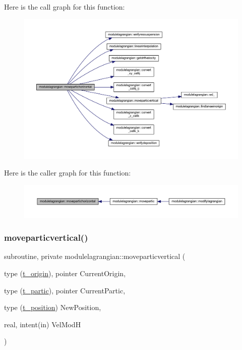 Here is the call graph for this function\+:\nopagebreak
\begin{figure}[H]
\begin{center}
\leavevmode
\includegraphics[width=350pt]{namespacemodulelagrangian_a9117067712a5138b783af1e0e971235f_cgraph}
\end{center}
\end{figure}
Here is the caller graph for this function\+:\nopagebreak
\begin{figure}[H]
\begin{center}
\leavevmode
\includegraphics[width=350pt]{namespacemodulelagrangian_a9117067712a5138b783af1e0e971235f_icgraph}
\end{center}
\end{figure}
\mbox{\label{namespacemodulelagrangian_aee1cf00f54feae6409c4674532876dcc}} 
\subsubsection{\texorpdfstring{moveparticvertical()}{moveparticvertical()}}
{\footnotesize\ttfamily subroutine, private modulelagrangian\+::moveparticvertical (\begin{DoxyParamCaption}\item[{type (\mbox{\hyperlink{structmodulelagrangian_1_1t__origin}{t\+\_\+origin}}), pointer}]{Current\+Origin,  }\item[{type (\mbox{\hyperlink{structmodulelagrangian_1_1t__partic}{t\+\_\+partic}}), pointer}]{Current\+Partic,  }\item[{type (\mbox{\hyperlink{structmodulelagrangian_1_1t__position}{t\+\_\+position}})}]{New\+Position,  }\item[{real, intent(in)}]{Vel\+ModH }\end{DoxyParamCaption})\hspace{0.3cm}{\ttfamily [private]}}

